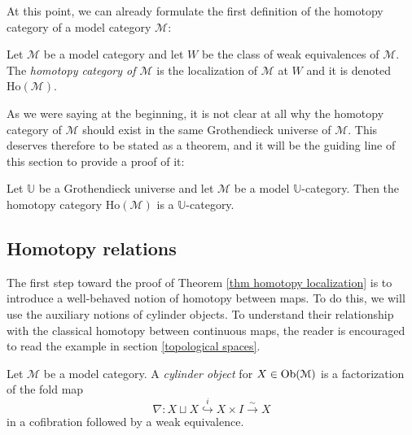 \begin{refsection}
At this point, we can already formulate the first definition of the homotopy category of a model category $\mathcal M$:

\begin{defin}
Let $\mathcal M$ be a model category and let $W$ be the class of weak equivalences of $\mathcal M$. The \emph{homotopy category of $\mathcal M$} is the localization of $\mathcal M$ at $W$ and it is denoted $\mathrm{Ho}(\mathcal M)$.
\end{defin}

As we were saying at the beginning, it is not clear at all why the homotopy category of $\mathcal M$ should exist in the same Grothendieck universe of $\mathcal M$. This deserves therefore to be stated as a theorem, and it will be the guiding line of this section to provide a proof of it:

\begin{thm} \label{thm homotopy localization}
Let $\mathbb U$ be a Grothendieck universe and let $\mathcal M$ be a model $\mathbb U$-category. Then the homotopy category $\mathrm{Ho}(\mathcal M)$ is a $\mathbb U$-category.
\end{thm}

\subsection{Homotopy relations}

The first step toward the proof of Theorem \ref{thm homotopy localization} is to introduce a well-behaved notion of homotopy between maps. To do this, we will use the auxiliary notions of cylinder objects. To understand their relationship with the classical homotopy between continuous maps, the reader is encouraged to read the example in section \ref{topological spaces}.

\begin{defin}
Let $\mathcal M$ be a model category. A \emph{cylinder object} for $X \in \operatorname{Ob}(\mathcal M)$ is a factorization of the fold map
\[
\nabla \colon X \sqcup X \stackrel{i}{\hookrightarrow} X \times I \stackrel{\sim}{\to} X
\]
in a cofibration followed by a weak equivalence.
\end{defin}

%


\end{refsection}
